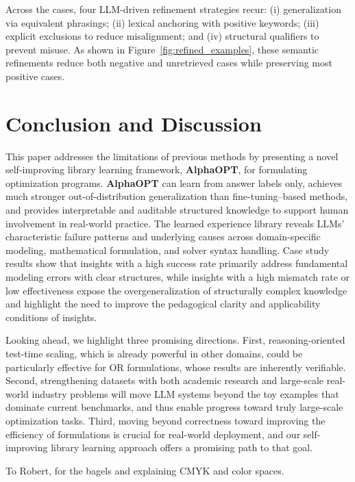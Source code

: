 \documentclass[sigconf, nonacm]{acmart}
\begin{document}
Across the cases, four LLM-driven refinement strategies recur: (i) generalization via equivalent phrasings; (ii) lexical anchoring with positive keywords; (iii) explicit exclusions to reduce misalignment; and (iv) structural qualifiers to prevent misuse. As shown in Figure~\ref{fig:refined_examples}, these semantic refinements reduce both negative and unretrieved cases while preserving most positive cases.

\section{Conclusion and Discussion}
\label{conclusion}

This paper addresses the limitations of previous methods by presenting a novel self-improving library learning framework, \textbf{AlphaOPT}, for formulating optimization programs. \textbf{AlphaOPT} can learn from answer labels only, achieves much stronger out-of-distribution generalization than fine-tuning–based methods, and provides interpretable and auditable structured knowledge to support human involvement in real-world practice. The learned experience library reveals LLMs’ characteristic failure patterns and underlying causes across domain-specific modeling, mathematical formulation, and solver syntax handling. Case study results show that insights with a high success rate primarily address fundamental modeling errors with clear structures, while insights with a high mismatch rate or low effectiveness expose the overgeneralization of structurally complex knowledge and highlight the need to improve the pedagogical clarity and applicability conditions of insights.


Looking ahead, we highlight three promising directions. First, reasoning-oriented test-time scaling, which is already powerful in other domains, could be particularly effective for OR formulations, whose results are inherently verifiable. Second, strengthening datasets with both academic research and large-scale real-world industry problems will move LLM systems beyond the toy examples that dominate current benchmarks, and thus enable progress toward truly large-scale optimization tasks. Third, moving beyond correctness toward improving the efficiency of formulations is crucial for real-world deployment, and our self-improving library learning approach offers a promising path to that goal.  

\begin{acks}
To Robert, for the bagels and explaining CMYK and color spaces.
\end{acks}
\end{document}
